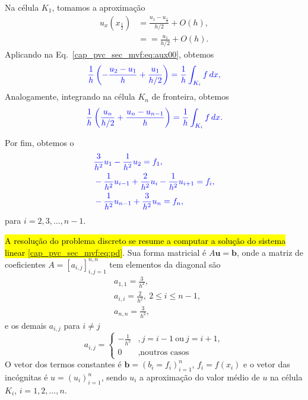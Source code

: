 Na célula $K_1$, tomamos a aproximação
\begin{subequations}
  \begin{align}
    u_x\left(x_{\frac{1}{2}}\right) &= \frac{u_{1} - u_{\frac{1}{2}}}{h/2} + O\left(h\right),\\
                                    &= = \frac{u_{1}}{h/2} + O\left(h\right).
  \end{align}
\end{subequations}
Aplicando na Eq.~\eqref{cap_pvc_sec_mvf:eq:aux00}, obtemos
\begin{equation}\color{blue}\frac{1}{h}\left(-\frac{u_{2}-u_{1}}{h} + \frac{u_1}{h/2}\right) = \frac{1}{h}\int_{K_i}f\,dx,
\end{equation}
Analogamente, integrando na célula $K_n$ de fronteira, obtemos
\begin{equation}\color{blue}\frac{1}{h}\left(\frac{u_{n}}{h/2} + \frac{u_{n} - u_{n-1}}{h}\right) = \frac{1}{h}\int_{K_i}f\,dx.
\end{equation}

Por fim, obtemos o 
\begin{subequations}\hleq\label{cap_pvc_sec_mvf:eq:pd}
  \begin{align}
    &\frac{3}{h^2}u_1 - \frac{1}{h^2}u_{2} = f_1,\\
    &-\frac{1}{h^2}u_{i-1} + \frac{2}{h^2}u_i - \frac{1}{h^2}u_{i+1} = f_i,\\
    &-\frac{1}{h^2}u_{n-1} + \frac{3}{h^2}u_{n} = f_n,
  \end{align}
\end{subequations}
para $i = 2, 3, \dotsc, n-1$.

\begin{flushleft}
\end{flushleft}

\hl{A resolução do problema discreto se resume a computar a solução do sistema linear {\eqref{cap_pvc_sec_mvf:eq:pd}}}. Sua forma matricial é $A\pmb{u} = \pmb{b}$, onde a matriz de coeficientes $A = [a_{i,j}]_{i,j=1}^{n,n}$ tem elementos da diagonal são
\begin{subequations}
  \begin{align}
    &a_{1,1} = \frac{3}{h^2},\\
    &a_{i,i} = \frac{2}{h^2}, ~2\leq i \leq n-1,\\
    &a_{n,n} = \frac{3}{h^2},
  \end{align}
\end{subequations}
e os demais $a_{i,j}$ para $i\neq j$
\begin{equation}
  a_{i,j} = \left\{
    \begin{array}{ll}
      - \frac{1}{h^2} &, j=i-1 ~\text{ou} ~j=i+1,\\
      0 &, \text{noutros casos}
    \end{array}
\right.
\end{equation}
O vetor dos termos constantes é $\pmb{b} = (b_i = f_i)_{i=1}^n$, $f_i = f(x_i)$ e o vetor das incógnitas é $u = (u_i)_{i=1}^n$, sendo $u_i$ a aproximação do valor médio de $u$ na célula $K_i$, $i = 1, 2, \dotsc, n$.

